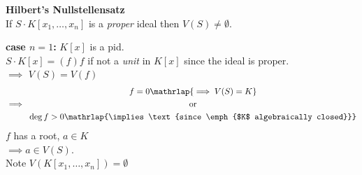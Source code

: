 \textbf{Hilbert's Nullstellensatz} \\
If $S\cdot K[x_1,\dotsc,x_n]$ is a \emph{proper} ideal then $V(S)\neq\emptyset$.

\textbf{case $n=1$:} $K[x]$ is a pid. \\
$S\cdot K[x]=(f)$\quad $f$ if not a \emph{unit} in $K[x]$ since the ideal is proper. \\
$\implies$ $V(S)=V(f)$ \\
\[ \implies\; \begin{gathered}
f=0 \mathrlap{\implies V(S)=K} \\
\text{or} \\
\deg f > 0 \mathrlap{\implies\text{since \emph{$K$ algebraically closed}}}
\end{gathered} \]
$f$ has a root, $a\in K$ \\
$\implies a\in V(S)$. \\
Note $V(K[x_1,\dotsc,x_n])=\emptyset$

